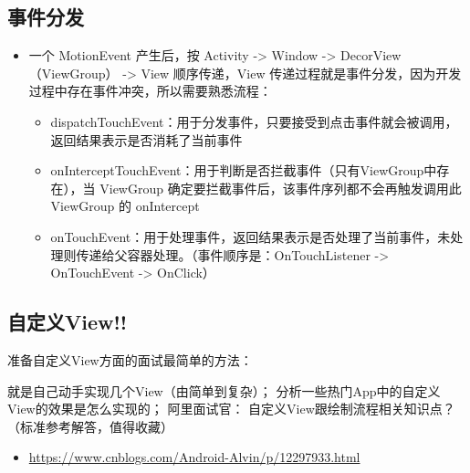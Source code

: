 \documentclass[9pt, b5paper]{article}
\begin{document}
\subsection{事件分发}
\label{sec-1-9}
\begin{itemize}
\item 一个 MotionEvent 产生后，按 Activity -> Window -> DecorView（ViewGroup） -> View 顺序传递，View 传递过程就是事件分发，因为开发过程中存在事件冲突，所以需要熟悉流程：
\begin{itemize}
\item dispatchTouchEvent：用于分发事件，只要接受到点击事件就会被调用，返回结果表示是否消耗了当前事件
\item onInterceptTouchEvent：用于判断是否拦截事件（只有ViewGroup中存在），当 ViewGroup 确定要拦截事件后，该事件序列都不会再触发调用此 ViewGroup 的 onIntercept
\item onTouchEvent：用于处理事件，返回结果表示是否处理了当前事件，未处理则传递给父容器处理。（事件顺序是：OnTouchListener -> OnTouchEvent -> OnClick）
\end{itemize}
\end{itemize}
\subsection{自定义View!!}
\label{sec-1-10}
准备自定义View方面的面试最简单的方法：

就是自己动手实现几个View（由简单到复杂）；
分析一些热门App中的自定义View的效果是怎么实现的；
阿里面试官： 自定义View跟绘制流程相关知识点？（标准参考解答，值得收藏）
\begin{itemize}
\item \url{https://www.cnblogs.com/Android-Alvin/p/12297933.html}
\end{itemize}
\end{document}
